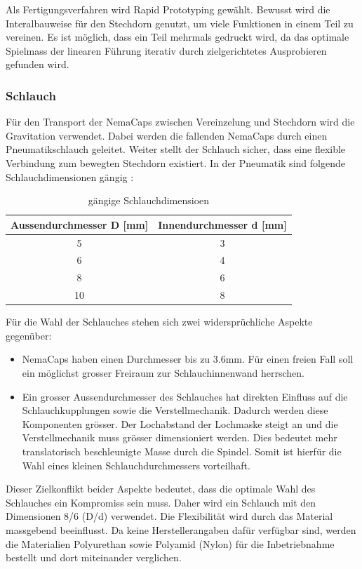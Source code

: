 Als Fertigungsverfahren wird Rapid Prototyping gewählt. Bewusst wird die Interalbauweise für den Stechdorn genutzt, um viele Funktionen in einem Teil zu vereinen. Es ist möglich, dass ein Teil mehrmals gedruckt wird, da das optimale Spielmass der linearen Führung iterativ durch zielgerichtetes Ausprobieren gefunden wird. 

\subsubsection{Schlauch}
Für den Transport der NemaCaps zwischen Vereinzelung und Stechdorn wird die Gravitation verwendet. Dabei werden die fallenden NemaCaps durch einen Pneumatikschlauch geleitet. Weiter stellt der Schlauch sicher, dass eine flexible Verbindung zum bewegten Stechdorn existiert. In der Pneumatik sind folgende Schlauchdimensionen gängig \cite{camozzi}:
\newline
\begin{table}[H]
\begin{tabular}{|c|c|}
	\hline 
	Aussendurchmesser D [mm] & Innendurchmesser d [mm] \\ 
	\hline 
	5 & 3 \\ 
	\hline 
	6 & 4  \\ 
	\hline 
	8 & 6 \\ 
	\hline 
	10 & 8  \\ 
	\hline 
\end{tabular}
	\caption{gängige Schlauchdimensioen}
	\label{tab:Schlauchdimensioen}
\end{table}

Für die Wahl der Schlauches stehen sich zwei widersprüchliche Aspekte gegenüber:
\begin{itemize}
	\item NemaCaps haben einen Durchmesser bis zu 3.6mm. Für einen freien Fall soll ein möglichst grosser Freiraum zur Schlauchinnenwand herrschen.
	
	\item Ein grosser Aussendurchmesser des Schlauches hat direkten Einfluss auf die Schlauchkupplungen sowie die Verstellmechanik. Dadurch werden diese Komponenten grösser. Der Lochabstand der Lochmaske steigt an und die Verstellmechanik muss grösser dimensioniert werden. Dies bedeutet mehr translatorisch beschleunigte Masse durch die Spindel. Somit ist hierfür die Wahl eines kleinen Schlauchdurchmessers vorteilhaft.
\end{itemize}
Dieser Zielkonflikt beider Aspekte bedeutet, dass die optimale Wahl des Schlauches ein Kompromiss sein muss. Daher wird ein Schlauch mit den Dimensionen 8/6 (D/d) verwendet.
\newline
Die Flexibilität wird durch das Material massgebend beeinflusst. Da keine Herstellerangaben dafür verfügbar sind, werden die Materialien Polyurethan sowie Polyamid (Nylon) für die Inbetriebnahme bestellt und dort miteinander verglichen.
\newpage
